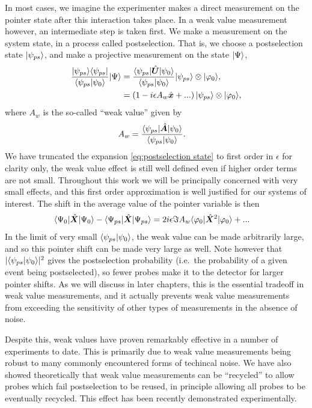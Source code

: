 In most cases, we imagine the experimenter makes a direct measurement on the pointer state after this interaction takes place.  In a weak value measurement however, an intermediate step is taken first.  We make a measurement on the system state, in a process called postselection.  That is, we choose a postselection state $\lvert \psi_{ps}\rangle$, and make a projective measurement on the state $\lvert \Psi\rangle$,
\begin{align}\label{eq:postselection state}
  \nonumber \frac{\lvert \psi_{ps}\rangle\langle \psi_{ps} \rvert}{\langle \psi_{ps} \vert \psi_0 \rangle} \lvert \Psi\rangle &= \frac{\langle \psi_{ps} \rvert\hat{\bm U}\lvert \psi_0\rangle}{\langle \psi_{ps} \vert \psi_0 \rangle}\lvert \psi_{ps}\rangle \otimes \lvert \varphi_0\rangle, \\
                                                                      &= \left(1 - i\epsilon A_w \hat{\bm x} + ...  \right)\lvert \psi_{ps}\rangle \otimes \lvert \varphi_0\rangle,
\end{align}
where $A_w$ is the so-called ``weak value'' given by
\begin{align}
  A_w &= \frac{\langle \psi_{ps} \rvert\hat{\bm A}\lvert \psi_0\rangle}{\langle \psi_{ps} \vert \psi_0 \rangle}.
\end{align}
We have truncated the expansion \eqref{eq:postselection state} to first order in $\epsilon$ for clarity only, the weak value effect is still well defined even if higher order terms are not small.  Throughout this work we will be principally concerned with very small effects, and this first order approximation is well justified for our systems of interest.  The shift in the average value of the pointer variable is then
\begin{align}
  \langle \Psi_0 \rvert\hat{\bm X}\lvert \Psi_0\rangle - \langle \Psi_{ps} \rvert\hat{\bm X}\lvert \Psi_{ps}\rangle &= 2i\epsilon \Im{A_w} \langle \varphi_0 \rvert\hat{\bm X}^2\lvert \varphi_0\rangle + ...
\end{align}
In the limit of very small $\langle \psi_{ps} \vert \psi_0 \rangle$, the weak value can be made arbitrarily large, and so this pointer shift can be made very large as well.  Note however that $|\langle \psi_{ps} \vert \psi_0 \rangle|^2$ gives the postselection probability (i.e.~the probability of a given event being postselected), so fewer probes make it to the detector for larger pointer shifts.  As we will discuss in later chapters, this is the essential tradeoff in weak value measurements, and it actually prevents weak value measurements from exceeding the sensitivity of other types of measurements in the absence of noise.

Despite this, weak values have proven remarkably effective in a number of experiments to date.  This is primarily due to weak value measurements being robust to many commonly encountered forms of techincal noise.  We have also showed theoretically that weak value measurements can be ``recycled'' to allow probes which fail postselection to be reused, in principle allowing all probes to be eventually recycled.  This effect has been recently demonstrated experimentally.

